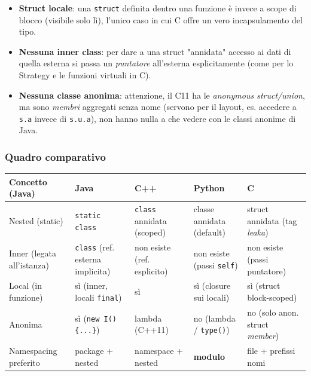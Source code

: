 \documentclass{report}
\newcommand{\code}[1]{\texttt{\small #1}}
\begin{document}
\begin{itemize}
    \item \textbf{Struct locale}: una \code{struct} definita dentro una funzione
    è invece a scope di blocco (visibile solo lì), l'unico caso in cui C offre un
    vero incapsulamento del tipo.
    \item \textbf{Nessuna inner class}: per dare a una struct "annidata" accesso
    ai dati di quella esterna si passa un \emph{puntatore} all'esterna
    esplicitamente (come per lo Strategy e le funzioni virtuali in C).
    \item \textbf{Nessuna classe anonima}: attenzione, il C11 ha le
    \emph{anonymous struct/union}, ma sono \emph{membri} aggregati senza nome
    (servono per il layout, es. accedere a \code{s.a} invece di \code{s.u.a}), non
    hanno nulla a che vedere con le classi anonime di Java.
\end{itemize}

\subsubsection{Quadro comparativo}

\begin{center}
\renewcommand{\arraystretch}{1.35}
\footnotesize
\begin{tabular}{|>{\raggedright\arraybackslash}p{2.5cm}|>{\raggedright\arraybackslash}p{2.4cm}|>{\raggedright\arraybackslash}p{2.6cm}|>{\raggedright\arraybackslash}p{3.0cm}|>{\raggedright\arraybackslash}p{2.2cm}|}
\hline
\textbf{Concetto (Java)} & \textbf{Java} & \textbf{C++} & \textbf{Python} & \textbf{C} \\
\hline
Nested (static) & \code{static class} & \code{class} annidata (scoped) & classe annidata (default) & struct annidata (tag \emph{leaka}) \\
\hline
Inner (legata all'istanza) & \code{class} (ref. esterna implicita) & non esiste (ref. esplicito) & non esiste (passi \code{self}) & non esiste (passi puntatore) \\
\hline
Local (in funzione) & sì (inner, locali \code{final}) & sì & sì (closure sui locali) & sì (struct block-scoped) \\
\hline
Anonima & sì (\code{new I()\{...\}}) & lambda (C++11) & no (lambda / \code{type()}) & no (solo anon. struct \emph{member}) \\
\hline
Namespacing preferito & package + nested & namespace + nested & \textbf{modulo} & file + prefissi nomi \\
\hline
\end{tabular}
\end{center}
\end{document}
